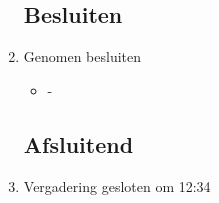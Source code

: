 \documentclass{article}
\begin{document}
\begin{enumerate}
	\subsection*{Besluiten}
	\item Genomen besluiten
	\begin{itemize}
		\item-
	\end{itemize}

	\noindent 
	\subsection*{Afsluitend}
	\item Vergadering gesloten om 12:34%

\end{enumerate}
\end{document}
